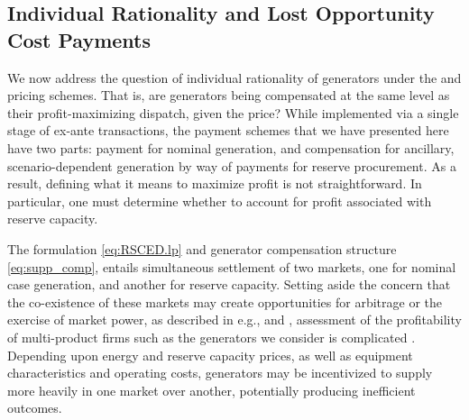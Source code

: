 \subsection{Individual Rationality and Lost Opportunity Cost Payments}\label{sec:IRandLOC}
We now address the question of individual rationality of generators under the \LMPnom{} and \LMPmar{} pricing schemes. That is, are generators being compensated at the same level as their profit-maximizing dispatch, given the price? While implemented via a single stage of ex-ante transactions, the payment schemes that we have presented here have two parts: payment for nominal generation, and compensation for ancillary, scenario-dependent generation by way of payments for reserve procurement. 
As a result, defining what it means to maximize profit is not straightforward. In particular, one must determine whether to account for profit associated with reserve capacity.

The \RSCED{} formulation \eqref{eq:RSCED.lp} and generator compensation structure \eqref{eq:supp_comp}, entails simultaneous settlement of two markets, one for nominal case generation, and another for reserve capacity. Setting aside the concern that the co-existence of these markets may create opportunities for arbitrage or the exercise of market power, as described in e.g., \cite{pritchard2010single} and \cite{borenstein2002measuring}, assessment of the profitability of multi-product firms such as the generators we consider is complicated \cite{hirst2000maximizing,buchsbaum2020spillovers}. 
Depending upon energy and reserve capacity prices, as well as equipment characteristics and operating costs, generators may be incentivized to supply more heavily in one market over another, potentially producing inefficient outcomes.

